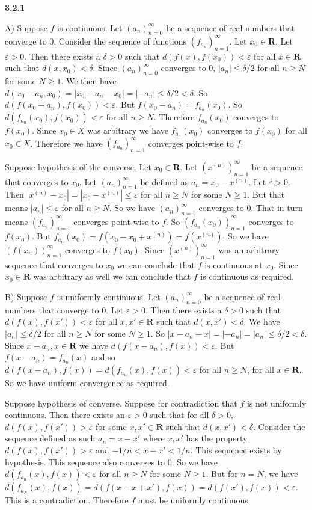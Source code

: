 \documentclass[12pt]{article}
\begin{document}
\textbf{3.2.1}

A) Suppose $f$ is continuous. Let $(a_n)^\infty_{n=0}$ be a sequence of real numbers that converge to 0. Consider the sequence of functions $(f_{a_n})^\infty_{n=1}$. Let $x_0\in \textbf{R}$. Let $\varepsilon>0$. Then there exists a $\delta>0$ such that $d(f(x),f(x_0)) < \varepsilon$ for all $x\in \textbf{R}$ such that $d(x,x_0) < \delta$. Since $(a_n)^\infty_{n=0}$ converges to 0, $|a_n| \leq \delta/2$ for all $n\geq N$ for some $N\geq 1$. We then have $d(x_0-a_n, x_0) = |x_0-a_n-x_0| = |-a_n| \leq \delta/2<\delta$. So $d(f(x_0-a_n),f(x_0)) < \varepsilon$. But $f(x_0-a_n) = f_{a_n}(x_0)$. So $d(f_{a_n}(x_0), f(x_0)) < \varepsilon$ for all $n\geq N$. Therefore $f_{a_n}(x_0)$ converges to $f(x_0)$. Since $x_0\in X$ was arbitrary we have $f_{a_n}(x_0)$ converges to $f(x_0)$ for all $x_0\in X$. Therefore we have $(f_{a_n})^\infty_{n=1}$ converges point-wise to $f$. 

Suppose hypothesis of the converse. Let $x_0\in \textbf{R}$. Let $(x^{(n)})^\infty_{n=1}$ be a sequence that converges to $x_0$. Let $(a_n)_{n=1}^\infty$ be defined as $a_n = x_0 - x^{(n)}$. Let $\varepsilon> 0$. Then $|x^{(n)}-x_0| = |x_0 -x^{(n)}| \leq \varepsilon$ for all $n\geq N$ for some $N\geq 1$. But that means $|a_n| \leq \varepsilon$ for all $n\geq N$. So we have $(a_n)_{n=1}^\infty$ converges to 0. That in turn means $(f_{a_n})^\infty_{n=1}$ converges point-wise to $f$. So $(f_{a_n}(x_0))^\infty_{n=1}$ converges to $f(x_0)$. But $f_{a_n}(x_0) = f(x_0-x_0 +x^{(n)}) = f(x^{(n)})$. So we have $(f(x_n))^\infty_{n=1}$ converges to $f(x_0)$. Since $(x^{(n)})^\infty_{n=1}$ was an arbitrary sequence that converges to $x_0$ we can conclude that $f$ is continuous at $x_0$. Since $x_0\in \textbf{R}$ was arbitrary as well we can conclude that $f$ is continuous as required.

B) Suppose $f$ is uniformly continuous. Let $(a_n)^\infty_{n=0}$ be a sequence of real numbers that converge to 0. Let $\varepsilon>0$. Then there exists a $\delta >0 $ such that $d(f(x),f(x')) <\varepsilon$ for all $x,x'\in \textbf{R}$ such that $d(x,x') <\delta$. We have $|a_n|\leq \delta/2$
for all $n\geq N$ for some $N\geq 1$. So $|x-a_n - x| = |-a_n| = |a_n| \leq \delta/2 < \delta$. Since $x-a_n, x\in \textbf{R}$ we have $d(f(x-a_n),f(x)) <\varepsilon$. But $f(x-a_n) = f_{a_n}(x)$ and so $d(f(x-a_n),f(x)) = d(f_{a_n}(x),f(x)) <\varepsilon$ for all $n\geq N$, for all $x\in \textbf{R}$. So we have uniform convergence as required. 

Suppose hypothesis of converse. Suppose for contradiction that $f$ is not uniformly continuous. Then there exists an $\varepsilon>0$ such that for all $\delta>0$, $d(f(x),f(x'))>\varepsilon$ for some $x,x'\in \textbf{R}$ such that $ d(x,x') <\delta$. Consider the sequence defined as such $ a_n = x-x'$ where $x,x'$ has the property $d(f(x),f(x'))>\varepsilon$ and $-1/n<x-x' < 1/n$. This sequence exists by hypothesis. This sequence also converges to 0. So we have $d(f_{a_n}(x),f(x)) <\varepsilon$ for all $n\geq N$ for some $N\geq 1$. But for $n= N$, we have $d(f_{a_N}(x),f(x)) =d(f(x - x+x'),f(x)) = d(f(x'),f(x)) <\varepsilon$. This is a contradiction. Therefore $f$ must be uniformly continuous.
\end{document}
